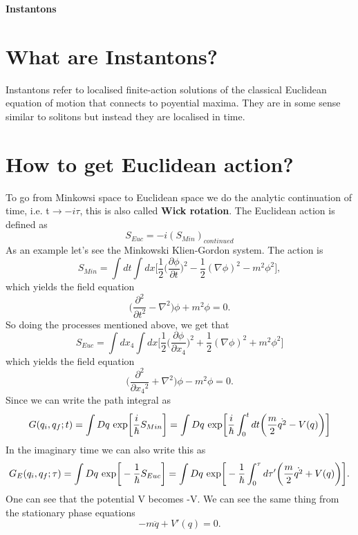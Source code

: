 \documentclass[a4paper, 12pt]{article}
\begin{document}
\begin{center} 
{\Huge{\textbf{Instantons}}}\\
\end{center}

\section {What are Instantons?}
Instantons refer to localised finite-action solutions of the classical Euclidean equation of motion that connects to poyential maxima. They are in some sense similar to solitons but instead they are localised in time. 
\section {How to get Euclidean action?}
To go from Minkowsi space to Euclidean space we do the analytic continuation of time, i.e. t$\to -i\tau$, this is also called \textbf{Wick rotation}. The Euclidean action is defined as
\begin{equation}
S_{Euc} = -i(S_{Min})_{continued}
\end{equation}
As an example let's see the Minkowski Klien-Gordon system. The action is 
\begin{equation}
S_{Min} = \int dt \int dx \bigg[\frac{1}{2}\bigg(\frac{\partial\phi}{\partial t} \bigg)^2 - \frac{1}{2}(\nabla \phi)^2 -m^2 \phi^2  \bigg],
\end{equation}
which yields the field equation
\begin{equation}
\bigg( \frac{\partial^2}{\partial t^2} - \nabla^2 \bigg)\phi + m^2\phi = 0.
\end{equation}
So doing the processes mentioned above, we get that
\begin{equation}%
S_{Euc} = \int dx_4 \int dx \bigg[\frac{1}{2}\bigg(\frac{\partial\phi}{\partial x_4} \bigg)^2 + \frac{1}{2}(\nabla \phi)^2 + m^2 \phi^2  \bigg]
\end{equation}
which yields the field equation
\begin{equation}%
\bigg( \frac{\partial^2}{\partial {x_4}^2} + \nabla^2 \bigg)\phi - m^2\phi = 0.
\end{equation}
Since we can write the path integral as
\begin{equation}%
G(q_i,q_f;t) = \int Dq \*\ \textrm{exp}\bigg[\frac{i}{\hbar}S_{Min}\bigg] =  \int Dq \*\ \textrm{exp}\bigg[\frac{i}{\hbar}\int_0^t dt \bigg(\frac{m}{2}\dot{q^2} - V(q) \bigg) \bigg]
\end{equation}
In the imaginary time we can also write this as
\begin{equation}%
G_E(q_i,q_f;\tau) = \int Dq \*\ \textrm{exp}\bigg[-\frac{1}{\hbar}S_{Euc}\bigg] =  \int Dq \*\ \textrm{exp}\bigg[-\frac{1}{\hbar}\int_0^\tau d\tau' \bigg(\frac{m}{2}\dot{q^2} + V(q) \bigg) \bigg].
\end{equation}
One can see that the potential V becomes -V. We can see the same thing from the stationary phase equations
\begin{equation}
-m\ddot{q} + V'(q) = 0.
\end{equation}
\end{document}
